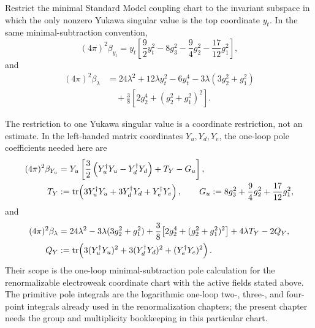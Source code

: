 \begin{controlledapproximation}
\label{cap:sm-one-loop-top-higgs-subsystem}
Restrict the minimal Standard Model coupling chart to the invariant subspace in
which the only nonzero Yukawa singular value is the top coordinate \(y_t\).
In the same minimal-subtraction convention,
\begin{equation}
  (4\pi)^2\beta_{y_t}
  =
  y_t\left[
    \frac{9}{2}y_t^2
    -8g_3^2
    -\frac{9}{4}g_2^2
    -\frac{17}{12}g_1^2
  \right],
  \label{eq:sm-one-loop-top-yukawa-beta}
\end{equation}
and
\begin{equation}
\begin{aligned}
  (4\pi)^2\beta_{\lambda}
  &=
  24\lambda^2
  +12\lambda y_t^2
  -6y_t^4
  -3\lambda(3g_2^2+g_1^2)\\
  &\quad
  +\frac{3}{8}\left[
    2g_2^4+(g_2^2+g_1^2)^2
  \right].
\end{aligned}
  \label{eq:sm-one-loop-lambda-beta}
\end{equation}
\end{controlledapproximation}

\noindent
The restriction to one Yukawa singular value is a coordinate restriction, not
an estimate.  In the left-handed matrix coordinates \(Y_u,Y_d,Y_e\), the
one-loop pole coefficients needed here are
\begin{align}
  (4\pi)^2\beta_{Y_u}
  &=
  Y_u\left[
    \frac32\left(Y_u^\dagger Y_u-Y_d^\dagger Y_d\right)
    +T_Y
    -G_u
  \right],
  \label{eq:sm-one-loop-yukawa-matrix-beta}\\
  T_Y
  &:=
  \operatorname{tr}\!\left(
    3Y_u^\dagger Y_u+3Y_d^\dagger Y_d+Y_e^\dagger Y_e
  \right),
  \qquad
  G_u:=8g_3^2+\frac94g_2^2+\frac{17}{12}g_1^2 ,
  \notag
\end{align}
and
\begin{align}
  (4\pi)^2\beta_\lambda
  &=
  24\lambda^2
  -3\lambda(3g_2^2+g_1^2)
  +\frac38\!\left[2g_2^4+(g_2^2+g_1^2)^2\right]
  +4\lambda T_Y-2Q_Y,
  \label{eq:sm-one-loop-lambda-matrix-beta}\\
  Q_Y
  &:=
  \operatorname{tr}\!\left(
    3(Y_u^\dagger Y_u)^2
    +3(Y_d^\dagger Y_d)^2
    +(Y_e^\dagger Y_e)^2
  \right).
  \notag
\end{align}
Their scope is the one-loop minimal-subtraction pole calculation for the
renormalizable electroweak coordinate chart with the active fields stated
above.  The primitive pole integrals are the logarithmic one-loop two-,
three-, and four-point integrals already used in the renormalization
chapters; the present chapter needs the group and multiplicity bookkeeping in this
particular chart.

